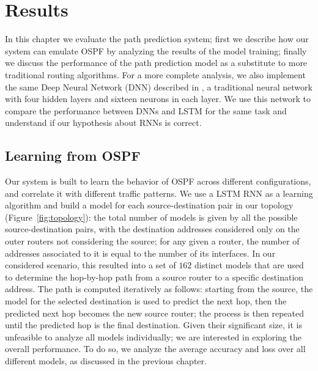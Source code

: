 \chapter{Results}\label{ch:results}

In this chapter we evaluate the path prediction system; first we describe how our system can emulate OSPF by analyzing the results of the model training; finally we discuss the performance of the path prediction model as a substitute to more traditional routing algorithms. For a more complete analysis, we also implement the same Deep Neural Network (DNN) described in \cite{Kato}, a traditional neural network with four hidden layers and sixteen neurons in each layer. We use this network to compare the performance between DNNs and LSTM for the same task and understand if our hypothesis about RNNs is correct.

\section{Learning from OSPF}
Our system is built to learn the  behavior of OSPF across different configurations, and correlate it with different traffic patterns. We use a LSTM RNN as a learning algorithm and build a model for each source-destination pair in our topology (Figure~\ref{fig:topology}): the total number of models is given by all the possible source-destination  pairs, with the destination addresses considered only on the outer routers not considering the source; for any given a router, the number of addresses associated to it is equal to the number of its interfaces. In our considered scenario, this resulted into a set of $162$ distinct models that are used to determine the hop-by-hop path from a source router to a specific destination address. The path is computed iteratively as follows: starting from the source, the model for the selected destination is used to predict the next hop, then the predicted next hop becomes the new source router; the process is then repeated until the predicted hop is the final destination. Given their significant size, it is unfeasible to analyze all models individually; we are interested in exploring the overall performance. To do so, we analyze the average accuracy and loss over all different models, as discussed in the previous chapter.

